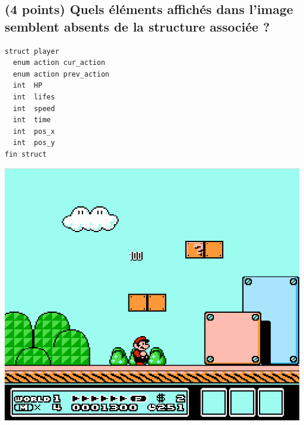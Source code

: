 \documentclass[11pt,a4paper]{article}
\begin{document}
\MakeExamTitle                   %




\renewcommand{\thesubsection}{\arabic{subsection}} %



\vfillFirst

\subsection{(4 points) Quels éléments affichés dans l'image semblent absents de la structure associée ? }

\begin{table}[h!]
  \centering
  \begin{minipage}{0.4\textwidth}
    \centering
\begin{lstlisting}[style=algorithmique]
struct player
  enum action cur_action
  enum action prev_action
  int  HP
  int  lifes
  int  speed
  int  time
  int  pos_x
  int  pos_y
fin struct \end{lstlisting}
  \end{minipage}
  \hfillx
  \begin{minipage}{0.55\textwidth}
    \centering
\includegraphics[width=\textwidth]{img/mario3.png}
  \end{minipage}
\end{table}
\end{document}
